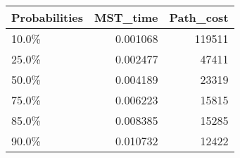 \begin{tabular}{lrr}
\toprule
Probabilities &  MST\_time &  Path\_cost \\
\midrule
        10.0\% &  0.001068 &     119511 \\
        25.0\% &  0.002477 &      47411 \\
        50.0\% &  0.004189 &      23319 \\
        75.0\% &  0.006223 &      15815 \\
        85.0\% &  0.008385 &      15285 \\
        90.0\% &  0.010732 &      12422 \\
\bottomrule
\end{tabular}
